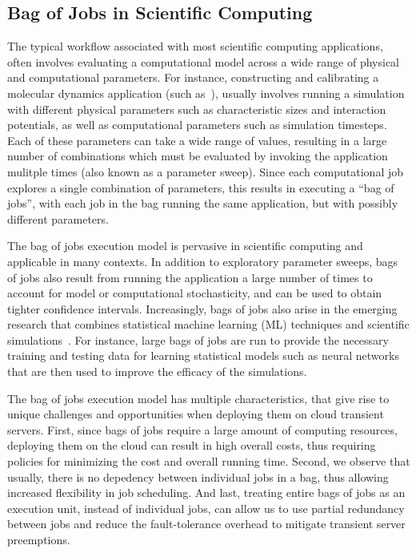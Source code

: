 \subsection{Bag of Jobs in Scientific Computing}

The typical workflow associated with most scientific computing applications, often involves evaluating a computational model across a wide range of physical and computational parameters. 
For instance, constructing and calibrating a molecular dynamics application (such as~\cite{jcs1}), usually involves running a simulation with different physical parameters such as characteristic sizes and interaction potentials, as well as computational parameters such as simulation timesteps. 
Each of these parameters can take a wide range of values, resulting in a large number of combinations which must be evaluated by invoking the application mulitple times (also known as a parameter sweep). 
Since each computational job explores a single combination of parameters, this results in executing a ``bag of jobs'', with each job in the bag running the same application, but with possibly different parameters. 


The bag of jobs execution model is pervasive in scientific computing and applicable in many contexts.
In addition to exploratory parameter sweeps, bags of jobs also result from running the application a large number of times to account for model or computational stochasticity, and can be used to obtain tighter confidence intervals. 
Increasingly, bags of jobs also arise in the emerging research that combines statistical machine learning (ML) techniques and scientific simulations~\cite{ml.atomic2017,melko2017,sam2017,fu2017,long2015machine, ferguson2017machine,ward2018matminer,jcs1,jcs2,fox2019learning}.
For instance, large bags of jobs are run to provide the necessary training and testing data for learning statistical models such as neural networks that are then used to improve the efficacy of the simulations. 


The bag of jobs execution model has multiple characteristics, that give rise to unique challenges and opportunities when deploying them on cloud transient servers. 
First, since bags of jobs require a large amount of computing resources, deploying them on the cloud can result in high overall costs, thus requiring policies for minimizing the cost and overall running time. 
Second, we observe that usually, there is no depedency between individual jobs in a bag, thus allowing increased flexibility in job scheduling.
And last, treating entire bags of jobs as an execution unit, instead of individual jobs, can allow us to use partial redundancy between jobs and reduce the fault-tolerance overhead to mitigate transient server preemptions. 


